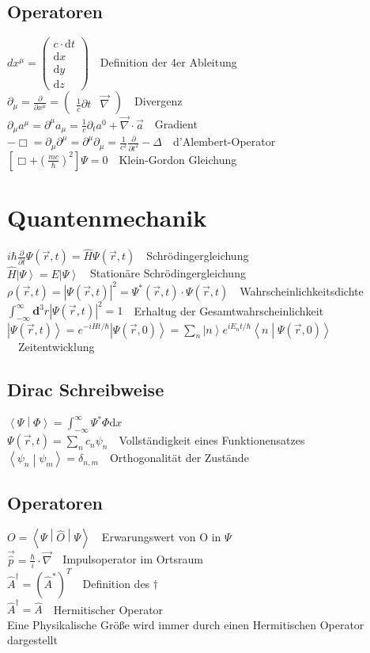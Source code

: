 \documentclass[8pt,a4paper]{extarticle}
\newcommand{\frml}[2]{$#1$~\hfill~#2\\}
\newcommand{\pder}[2]{\frac{\partial#1}{\partial#2}}
\newcommand{\ket}[1]{\left|#1\right\rangle}
\newcommand{\oper}[1]{\hat#1}
\newcommand{\braket}[2]                               %
{\left\langle#1 \middle| #2\right\rangle}
\newcommand{\bratenket}[3]                            %
{\left\langle#1 \middle| #2 \middle|  %
#3\right\rangle}
\begin{document}
\begin{multicols}{3}
\subsection{Operatoren}
\frml{dx^\mu = \begin{pmatrix} c\cdot\mathrm{d} t \\ \mathrm{d} x \\ \mathrm{d} y \\ \mathrm{d} z \end{pmatrix}}{Definition der 4er Ableitung}
\frml{\partial_\mu = \pder{}{x^\mu} = \begin{pmatrix} \frac{1}{c} \partial t & \vec{\nabla}\end{pmatrix}}{Divergenz}
\frml{\partial_\mu a^\mu = \partial^\mu a_\mu = \frac{1}{c}\partial_t a^0+\vec{\nabla}\cdot\vec{a}}{Gradient}
\frml{-\Box = \partial_\mu \partial^\mu = \partial^\mu \partial_\mu = \frac{1}{c^2}\pder{}{t^2}-\Delta}{d'Alembert-Operator}

\frml{\left[\Box +  \left( \frac{mc}{\hbar} \right)^2\right]\Psi = 0}{Klein-Gordon Gleichung}

\section{Quantenmechanik}
\frml{i\hbar\pder{}{t}\Psi(\vec{r},t) = \oper{H}\Psi(\vec{r},t)}{Schr\"odingergleichung}
\frml{\oper{H}\ket{\Psi} = E\ket{\Psi}}{Station\"are Schr\"odingergleichung}
\frml{\rho(\vec{r}, t) = \left| \Psi(\vec{r}, t) \right|^2 = \Psi^*(\vec{r}, t) \cdot \Psi(\vec{r}, t)}{Wahrscheinlichkeitsdichte}
\frml{\int_{-\infty}^{\infty}\mathbf{d}^3r \left|\Psi(\vec{r},t)\right|^2 = 1}{Erhaltug der Gesamtwahrscheinlichkeit}
\frml{\ket{\Psi(\vec{r}, t)} = e^{-i\oper{H}t/\hbar}\ket{\Psi(\vec{r}, 0)} = \sum_n \ket{n} e^{iE_nt/\hbar}\braket{n}{\Psi(\vec{r}, 0)}}{Zeitentwicklung}
\subsection{Dirac Schreibweise}
\frml{\braket{\Psi}{\Phi} = \int_{-\infty}^{\infty}\Psi^*\Phi \mathrm{d}x}{}
\frml{\Psi(\vec{r}, t) = \sum_{n}c_{n}\psi_{n}}{Vollst\"andigkeit eines Funktionensatzes}
\frml{\braket{\psi_n}{\psi_m} = \delta_{n,m}}{Orthogonalit\"at der Zust\"ande}
\subsection{Operatoren}
\frml{O = \bratenket{\Psi}{\oper{O}}{\Psi}}{Erwarungswert von O in $\Psi$}
\frml{\vec{\oper{p}} = \frac{\hbar}{i}\cdot \vec{\nabla}}{Impulsoperator im Ortsraum}
\frml{\oper{A}^\dagger = (\oper{A}^*)^T}{Definition des $\dagger$}
\frml{\oper{A}^\dagger = \oper{A}}{Hermitischer Operator}
Eine Physikalische Gr\"o{\ss}e wird immer durch einen Hermitischen Operator dargestellt

\end{multicols}
\end{document}
